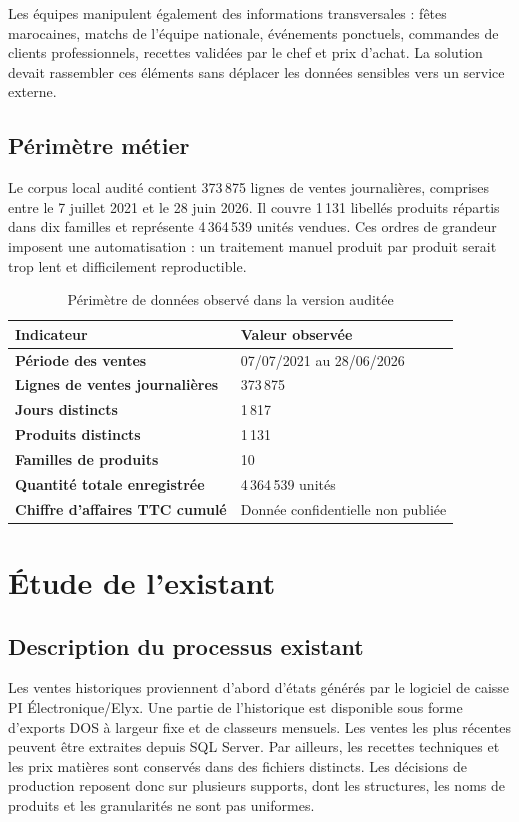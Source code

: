 Les équipes manipulent également des informations transversales : fêtes
marocaines, matchs de l'équipe nationale, événements ponctuels, commandes de
clients professionnels, recettes validées par le chef et prix d'achat. La solution
devait rassembler ces éléments sans déplacer les données sensibles vers un service
externe.

\subsection{Périmètre métier}

Le corpus local audité contient 373\,875 lignes de ventes journalières, comprises
entre le 7 juillet 2021 et le 28 juin 2026. Il couvre 1\,131 libellés produits
répartis dans dix familles et représente 4\,364\,539 unités vendues. Ces ordres de
grandeur imposent une automatisation : un traitement manuel produit par produit
serait trop lent et difficilement reproductible.

\begin{table}[H]
\centering
\caption{Périmètre de données observé dans la version auditée}
\label{tab:perimetre-donnees}
\begin{tabularx}{\textwidth}{>{\bfseries}p{4.4cm}Y}
\toprule
Indicateur & Valeur observée \\
\midrule
Période des ventes & 07/07/2021 au 28/06/2026 \\
Lignes de ventes journalières & 373\,875 \\
Jours distincts & 1\,817 \\
Produits distincts & 1\,131 \\
Familles de produits & 10 \\
Quantité totale enregistrée & 4\,364\,539 unités \\
Chiffre d'affaires TTC cumulé & Donnée confidentielle non publiée \\
\bottomrule
\end{tabularx}
\end{table}

\section{Étude de l'existant}

\subsection{Description du processus existant}

Les ventes historiques proviennent d'abord d'états générés par le logiciel de
caisse PI Électronique/Elyx. Une partie de l'historique est disponible sous forme
d'exports DOS à largeur fixe et de classeurs mensuels. Les ventes les plus récentes
peuvent être extraites depuis SQL Server. Par ailleurs, les recettes techniques et
les prix matières sont conservés dans des fichiers distincts. Les décisions de
production reposent donc sur plusieurs supports, dont les structures, les noms de
produits et les granularités ne sont pas uniformes.

